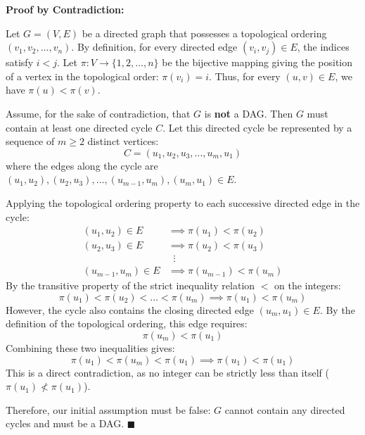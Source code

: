 \documentclass[11pt,english]{article}
\begin{document}
\begin{enumerate}[resume]
\textbf{Proof by Contradiction:}

Let $G = (V, E)$ be a directed graph that possesses a topological ordering $(v_1, v_2, \dots, v_n)$. By definition, for every directed edge $(v_i, v_j) \in E$, the indices satisfy $i < j$. Let $\pi: V \to \{1, 2, \dots, n\}$ be the bijective mapping giving the position of a vertex in the topological order: $\pi(v_i) = i$. Thus, for every $(u, v) \in E$, we have $\pi(u) < \pi(v)$.

Assume, for the sake of contradiction, that $G$ is \textbf{not} a DAG.
Then $G$ must contain at least one directed cycle $C$. Let this directed cycle be represented by a sequence of $m \ge 2$ distinct vertices:
\begin{equation}
    C = (u_1, u_2, u_3, \dots, u_m, u_1)
\end{equation}
where the edges along the cycle are $(u_1, u_2), (u_2, u_3), \dots, (u_{m-1}, u_m), (u_m, u_1) \in E$.

Applying the topological ordering property to each successive directed edge in the cycle:
\begin{align}
    (u_1, u_2) \in E &\implies \pi(u_1) < \pi(u_2) \\
    (u_2, u_3) \in E &\implies \pi(u_2) < \pi(u_3) \\
    &\;\;\vdots \\
    (u_{m-1}, u_m) \in E &\implies \pi(u_{m-1}) < \pi(u_m)
\end{align}
By the transitive property of the strict inequality relation $<$ on the integers:
\begin{equation}
    \pi(u_1) < \pi(u_2) < \dots < \pi(u_m) \implies \pi(u_1) < \pi(u_m)
\end{equation}
However, the cycle also contains the closing directed edge $(u_m, u_1) \in E$. By the definition of the topological ordering, this edge requires:
\begin{equation}
    \pi(u_m) < \pi(u_1)
\end{equation}
Combining these two inequalities gives:
\begin{equation}
    \pi(u_1) < \pi(u_m) < \pi(u_1) \implies \pi(u_1) < \pi(u_1)
\end{equation}
This is a direct contradiction, as no integer can be strictly less than itself ($\pi(u_1) \not< \pi(u_1)$).

Therefore, our initial assumption must be false: $G$ cannot contain any directed cycles and must be a DAG. $\blacksquare$

\end{enumerate}
\end{document}
